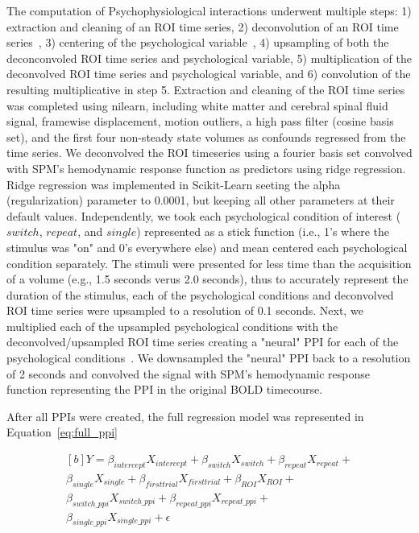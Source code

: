 \documentclass[phd,appendix,figures]{uithesis}
\begin{document}
The computation of Psychophysiological interactions underwent multiple steps:
1) extraction and cleaning of an ROI time series,
2) deconvolution of an ROI time series~\cite{Gitelman2003},
3) centering of the psychological variable~\cite{Di2017},
4) upsampling of both the deconconvoled ROI time series and psychological variable,
5) multiplication of the deconvolved ROI time series and psychological variable, and
6) convolution of the resulting multiplicative in step 5.
Extraction and cleaning of the ROI time series was completed using nilearn,
including white matter and cerebral spinal fluid signal, framewise displacement,
motion outliers, a high pass filter (cosine basis set), and the first four non-steady state
volumes as confounds regressed from the time series.
We deconvolved the ROI timeseries using a fourier basis set convolved with
SPM's hemodynamic response function as predictors using ridge regression.
Ridge regression was implemented in Scikit-Learn seeting the alpha (regularization)
parameter to 0.0001, but keeping all other parameters at their default values.
Independently, we took each psychological condition of interest ($switch$, $repeat$, and $single$)
represented as a stick function (i.e., 1's where the stimulus was "on" and 0's everywhere else)
and mean centered each psychological condition separately.
The stimuli were presented for less time than the acquisition of a volume
(e.g., 1.5 seconds verus 2.0 seconds), thus to accurately represent the duration
of the stimulus, each of the psychological conditions and deconvolved ROI time series were upsampled to
a resolution of 0.1 seconds.
Next, we multiplied each of the upsampled psychological conditions with the deconvolved/upsampled
ROI time series creating a "neural" PPI for each of the
psychological conditions~\cite{McLaren2012}.
We downsampled the "neural" PPI back to a resolution of 2 seconds and convolved the signal with
SPM's hemodynamic response function representing the PPI in the original BOLD timecourse.

After all PPIs were created, the full regression model was represented in Equation~\ref{eq:full_ppi}

\begin{equation}
	\begin{multlined}[b]
    Y = \beta_{intercept}X_{intercept} + \beta_{switch}X_{switch} + \beta_{repeat}X_{repeat} + \\
	      \beta_{single}X_{single} + \beta_{firsttrial}X_{firsttrial} + \beta_{ROI}X_{ROI} + \\
		\beta_{switch\_ppi}X_{switch\_ppi} + \beta_{repeat\_ppi}X_{repeat\_ppi} + \\
		\beta_{single\_ppi} X_{single\_ppi} + \epsilon
  \end{multlined}
  \label{eq:full_ppi}
\end{equation}
\end{document}
